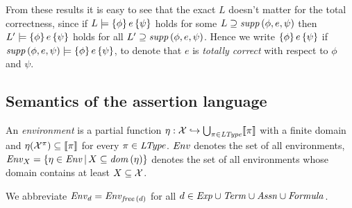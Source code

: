 \documentclass[12pt,a4paper]{report}
\begin{document}
From these results it is easy to see that the exact $L$ doesn't matter for the total correctness, since
if $L\models\{\phi\}\,e\,\{\psi\}$ holds for some $L \supseteq \mathit{supp}\,(\phi,e,\psi)$
then $L'\models\{\phi\}\,e\,\{\psi\}$ holds for all $L'\supseteq \mathit{supp}\,(\phi,e,\psi)$.
Hence we write $\{\phi\}\,e\,\{\psi\}$ if $\mathit{supp}\,(\phi,e,\psi)\models\{\phi\}\,e\,\{\psi\}$,
to denote that $e$ is {\em totally correct} with respect to $\phi$ and $\psi$. 



\subsection{Semantics of the assertion language}

\begin{definition}[Environment] \label{definition:Environment}
  An {\em environment} is a partial function $\eta: \mathcal{X} \hookrightarrow \bigcup_{\pi\in\mathit{LType}} \llbracket\pi\rrbracket$ with
  a finite domain and $\eta(\mathcal{X}^\pi) \subseteq \llbracket\pi\rrbracket$ for every $\pi \in \mathit{LType}$. $\mathit{Env}$ denotes
  the set of all environments, $\mathit{Env}_X = \{\eta\in\mathit{Env}\,|\,X \subseteq \mathit{dom}\,(\eta)\}$ denotes the set of
  all environments whose domain contains at least $X \subseteq \mathcal{X}$.
\end{definition}

We abbreviate $\mathit{Env}_d = \mathit{Env}_{\mathit{free}\,(d)}$ for all $d\in\mathit{Exp}\cup\mathit{Term}\cup\mathit{Assn}\cup\mathit{Formula}$.
\end{document}
